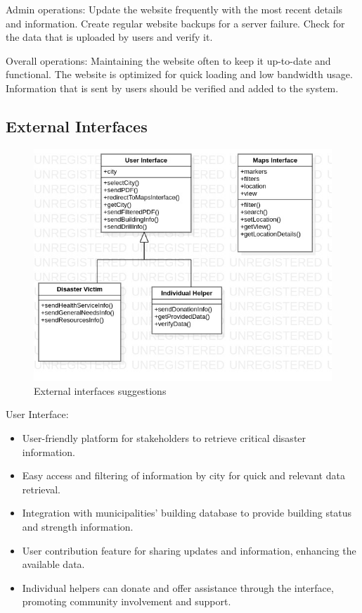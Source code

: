 \documentclass[12pt]{report}
\begin{document}
Admin operations: Update the website frequently with the most recent details and information. Create regular website backups for a server failure. Check for the data that is uploaded by users and verify it.

Overall operations: Maintaining the website often to keep it up-to-date and functional. The website is optimized for quick loading and low bandwidth usage. Information that is sent by users should be verified and added to the system.

\subsection{External Interfaces}
\begin{figure}[H]
    \includegraphics[scale=0.6]{ext2.jpg}
    \centering
    \caption{External interfaces suggestions}
\end{figure}

User Interface:
\begin{itemize}
    \item User-friendly platform for stakeholders to retrieve critical disaster information.
    \item Easy access and filtering of information by city for quick and relevant data retrieval.
    \item Integration with municipalities' building database to provide building status and strength information.
    \item User contribution feature for sharing updates and information, enhancing the available data.
    \item Individual helpers can donate and offer assistance through the interface, promoting community involvement and support.
\end{itemize}
\end{document}
